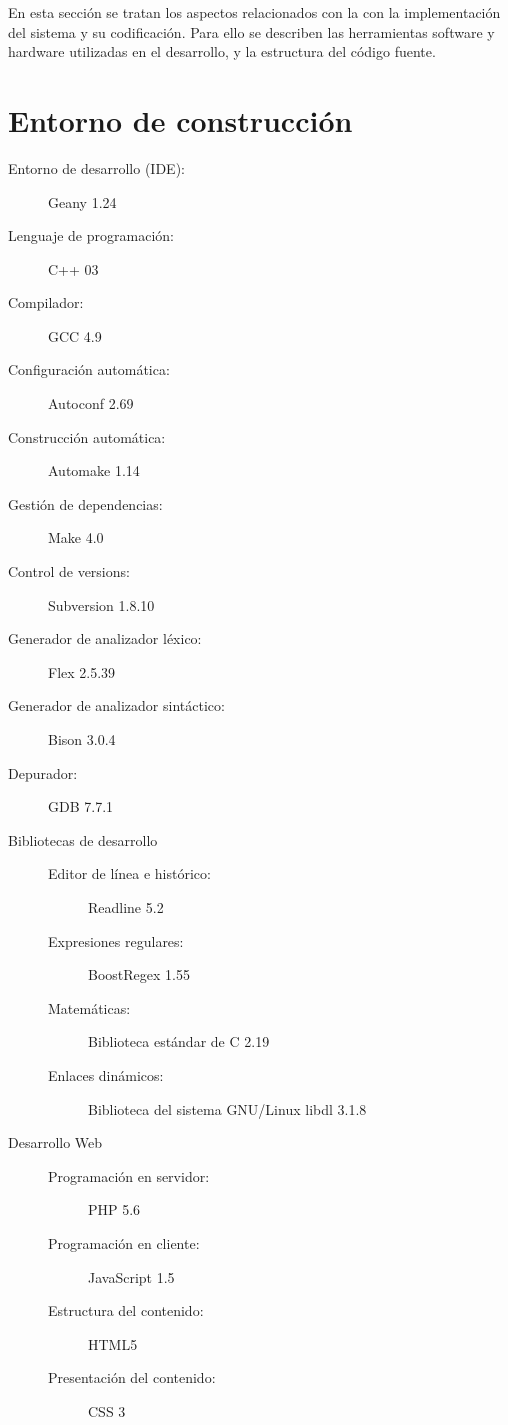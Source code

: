 
En esta sección se tratan los aspectos relacionados con la con la implementación
del sistema y su codificación. Para ello se describen las herramientas software
y hardware utilizadas en el desarrollo, y la estructura del código fuente. 

\section{Entorno de construcción}

\begin{description}
   \item[Entorno de desarrollo (IDE):] Geany 1.24 
   \item[Lenguaje de programación:] C++ 03
   \item[Compilador:] GCC 4.9
   \item[Configuración automática:] Autoconf 2.69
   \item[Construcción automática:] Automake 1.14
   \item[Gestión de dependencias:] Make 4.0
   \item[Control de versions:] Subversion 1.8.10
   \item[Generador de analizador léxico:] Flex 2.5.39
   \item[Generador de analizador sintáctico:] Bison 3.0.4
   \item[Depurador:] GDB  7.7.1
   \item[Bibliotecas de desarrollo] \hfill 
      \begin{description}
         \item[Editor de línea e histórico:] Readline 5.2
         \item[Expresiones regulares:] BoostRegex 1.55
         \item[Matemáticas:] Biblioteca estándar de C 2.19
         \item[Enlaces dinámicos:] Biblioteca del sistema GNU/Linux libdl 3.1.8
      \end{description}
   \item[Desarrollo Web] \hfill 
      \begin{description}
         \item[Programación en servidor:] PHP 5.6
         \item[Programación en cliente:] JavaScript 1.5
         \item[Estructura del contenido:] HTML5
         \item[Presentación del contenido:] CSS 3
      \end{description}
\end{description}


